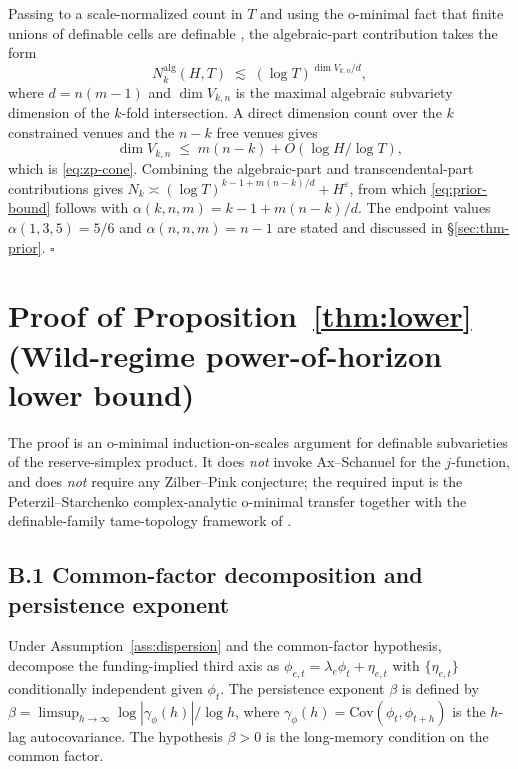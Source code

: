 \documentclass[12pt]{article}
\theoremstyle{sampledef}
\theoremstyle{sampleplain}
\theoremstyle{sampleremark}
\newcommand{\1}{\mathbf{1}}
\begin{document}
Passing to a scale-normalized count in $T$ and using the o-minimal
fact that finite unions of definable cells are definable
\citep{vandenDries1998Tame}, the algebraic-part contribution takes
the form
\[
N_k^{\text{alg}}(H,T) \;\lesssim\;
(\log T)^{\dim V_{k,n}/d},
\]
where $d = n(m-1)$ and $\dim V_{k,n}$ is the maximal algebraic
subvariety dimension of the $k$-fold intersection. A direct
dimension count over the $k$ constrained venues and the $n-k$
free venues \citep[\S 4]{Pila2011ManinMumford} gives
\[
\dim V_{k,n} \;\le\; m(n-k) + O(\log H / \log T),
\]
which is \eqref{eq:zp-cone}. Combining the algebraic-part and
transcendental-part contributions gives
$N_k \asymp (\log T)^{k-1 + m(n-k)/d} + H^\varepsilon$,
from which \eqref{eq:prior-bound} follows with
$\alpha(k,n,m) = k-1 + m(n-k)/d$. The endpoint values
$\alpha(1,3,5) = 5/6$ and $\alpha(n,n,m) = n-1$ are stated and
discussed in \S\ref{sec:thm-prior}. $\square$

\section{Proof of Proposition~\ref{thm:lower} (Wild-regime
power-of-horizon lower bound)}\label{app:thm-lower}

The proof is an o-minimal induction-on-scales argument for
definable subvarieties of the reserve-simplex product. It does
\emph{not} invoke Ax--Schanuel for the $j$-function, and does
\emph{not} require any Zilber--Pink conjecture; the required input
is the Peterzil--Starchenko complex-analytic o-minimal transfer
\citep{PeterzilStarchenko2008} together with the definable-family
tame-topology framework of \citet{BakkerKlinglerTsimerman2020}.

\subsection*{B.1 Common-factor decomposition and persistence
exponent}

Under Assumption~\ref{ass:dispersion} and the common-factor
hypothesis, decompose the funding-implied third axis as
$\phi_{e,t} = \lambda_e \phi_t + \eta_{e,t}$
with $\{\eta_{e,t}\}$ conditionally independent given $\phi_t$. The
persistence exponent $\beta$ is defined by
$\beta = \limsup_{h \to \infty}
\log|\gamma_\phi(h)| / \log h$,
where $\gamma_\phi(h) = \mathrm{Cov}(\phi_t, \phi_{t+h})$ is the
$h$-lag autocovariance. The hypothesis $\beta > 0$ is the
long-memory condition on the common factor.
\end{document}
